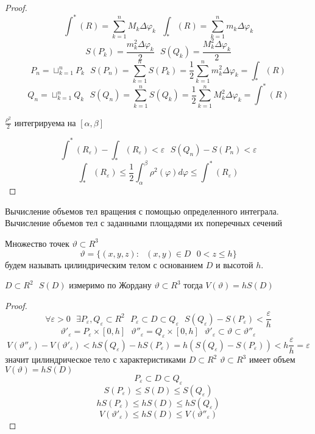 \begin{proof}
  $$
  \int^* (R) = \sum_{k=1}^n M_k \Delta \varphi_k ~~~
  \int_* (R) = \sum_{k=1}^n m_k \Delta \varphi_k
  $$
  $$
  S(P_k) = \frac{m_k^2 \Delta \varphi_k}{2} ~~~
  S(Q_k) = \frac{M_k^2 \Delta \varphi_k}{2}
  $$
  $$
  P_n = \sqcup_{k=1}^n P_k ~~~
  S(P_n) = \sum_{k=1}^n S(P_k) = \frac{1}{2} \sum_{k=1}^n m_k^2
  \Delta \varphi_k = \int_* (R)
  $$
  $$
  Q_n = \sqcup_{k=1}^n Q_k ~~~
  S(Q_n) = \sum_{k=1}^n S(Q_k) = \frac{1}{2} \sum_{k=1}^n M_k^2
  \Delta \varphi_k = \int^* (R)
  $$

  $\frac{\rho^2}{2}$ интегрируема на $[\alpha, \beta]$

  $$
  \int^* (R_{\varepsilon}) - \int_* (R_{\varepsilon}) < \varepsilon ~~~
  S(Q_n) - S(P_n) < \varepsilon
  $$
  $$
  \int_* (R_{\varepsilon}) \le
  \frac{1}{2} \int_{\alpha}^{\beta} \rho^2(\varphi) d\varphi \le
  \int^* (R_{\varepsilon})
  $$
\end{proof}

\begin{title}[\Large]
  Вычисление объемов тел вращения с помощью определенного интеграла. Вычисление
  объемов тел с заданными площадями их поперечных сечений
\end{title}

\begin{defin}[цилиндра]
  Множество точек $\vartheta \subset R^3$
  $$
  \vartheta = \{ (x,y,z): ~~~ (x,y) \in D ~~~ 0 < z \le h\}
  $$
  будем называть цилиндрическим телом с основанием $D$ и высотой $h$.
\end{defin}

\begin{theorem}
  $D \subset R^2 ~~~ S(D)$ измеримо по Жордану $\vartheta \subset R^3$ тогда
  $V(\vartheta) = h S(D)$
\end{theorem}

\begin{proof}
  $$
  \forall \varepsilon > 0 ~~~
  \exists P_{\varepsilon}, Q_{\varepsilon} \subset R^2 ~~~
  P_{\varepsilon} \subset D \subset Q_{\varepsilon} ~~~
  S(Q_{\varepsilon}) - S(P_{\varepsilon}) < \frac{\varepsilon}{h}
  $$
  $$
  \vartheta'_{\varepsilon} = P_{\varepsilon} \times [0,h] ~~~
  \vartheta''_{\varepsilon} = Q_{\varepsilon} \times [0,h] ~~~
  \vartheta'_{\varepsilon} \subset \vartheta \subset \vartheta''_{\varepsilon}
  $$
  $$
  V(\vartheta''_{\varepsilon}) - V(\vartheta'_{\varepsilon}) <
  h S(Q_{\varepsilon}) - h S(P_{\varepsilon}) =
  h (S(Q_{\varepsilon}) - S(P_{\varepsilon})) <
  h \frac{\varepsilon}{h} = \varepsilon
  $$
  значит цилиндрическое тело с характеристиками $D \subset R^2$
  $\vartheta \subset R^3$ имеет объем $V(\vartheta) = h S(D)$
  $$
  P_{\varepsilon} \subset D \subset Q_{\varepsilon}
  $$
  $$
  S(P_{\varepsilon}) \le S(D) \le S(Q_{\varepsilon})
  $$
  $$
  hS(P_{\varepsilon}) \le hS(D) \le hS(Q_{\varepsilon})
  $$
  $$
  V(\vartheta'_{\varepsilon}) \le h S(D) \le V(\vartheta''_{\varepsilon})
  $$
\end{proof}

